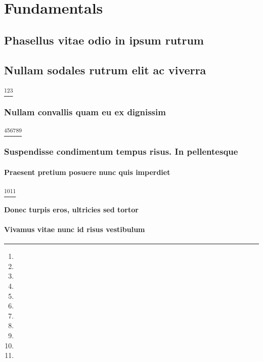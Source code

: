 \documentclass[%
  german,%
  exercise,%
  oneside,%
]{iswartcl}
\begin{document}
\chapter{Fundamentals}

\lipsum[1-8]

\section{Phasellus vitae odio in ipsum rutrum}

\lipsum[1-8]

\section{Nullam sodales rutrum elit ac viverra}

\lipsum[1-8]\footnote{\lipsum[1]}\footnote{\lipsum[1]}\footnote{\lipsum[1]}

\subsection{Nullam convallis quam eu ex dignissim}

\lipsum[1-8]\footnote{\lipsum[1]}\footnote{\lipsum[1]}\footnote{\lipsum[1]}\footnote{\lipsum[1]}\footnote{\lipsum[1]}\footnote{\lipsum[1]}

\subsection{Suspendisse condimentum tempus risus. In pellentesque}

\lipsum[1-8]

\subsubsection{Praesent pretium posuere nunc quis imperdiet}

\lipsum[1-8]\footnote{\lipsum[1]}\footnote{\lipsum[1]}

\subsubsection{Donec turpis eros, ultricies sed tortor}

\lipsum[1-8]

\subsubsection{Vivamus vitae nunc id risus vestibulum}
\end{document}
